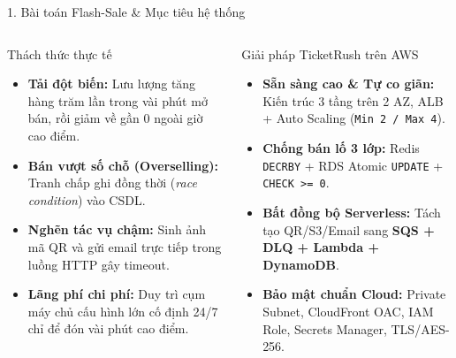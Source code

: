 \documentclass[aspectratio=169,11pt]{beamer}
\begin{document}
\begin{frame}{1. Bài toán Flash-Sale \& Mục tiêu hệ thống}
  \begin{columns}[T]
    \begin{block}{Thách thức thực tế}
      \footnotesize
      \begin{itemize}
        \setlength{\itemsep}{4pt}
        \item \textbf{Tải đột biến:} Lưu lượng tăng hàng trăm lần trong vài phút mở bán, rồi giảm về gần 0 ngoài giờ cao điểm.
        \item \textbf{Bán vượt số chỗ (Overselling):} Tranh chấp ghi đồng thời (\textit{race condition}) vào CSDL.
        \item \textbf{Nghẽn tác vụ chậm:} Sinh ảnh mã QR và gửi email trực tiếp trong luồng HTTP gây timeout.
        \item \textbf{Lãng phí chi phí:} Duy trì cụm máy chủ cấu hình lớn cố định 24/7 chỉ để đón vài phút cao điểm.
      \end{itemize}
    \end{block}

    \begin{block}{Giải pháp TicketRush trên AWS}
      \footnotesize
      \begin{itemize}
        \setlength{\itemsep}{4pt}
        \item \textbf{Sẵn sàng cao \& Tự co giãn:} Kiến trúc 3 tầng trên 2 AZ, ALB + Auto Scaling (\texttt{Min 2 / Max 4}).
        \item \textbf{Chống bán lố 3 lớp:} Redis \texttt{DECRBY} + RDS Atomic \texttt{UPDATE} + \texttt{CHECK >= 0}.
        \item \textbf{Bất đồng bộ Serverless:} Tách tạo QR/S3/Email sang \textbf{SQS + DLQ + Lambda + DynamoDB}.
        \item \textbf{Bảo mật chuẩn Cloud:} Private Subnet, CloudFront OAC, IAM Role, Secrets Manager, TLS/AES-256.
      \end{itemize}
    \end{block}
  \end{columns}
\end{frame}
\end{document}
